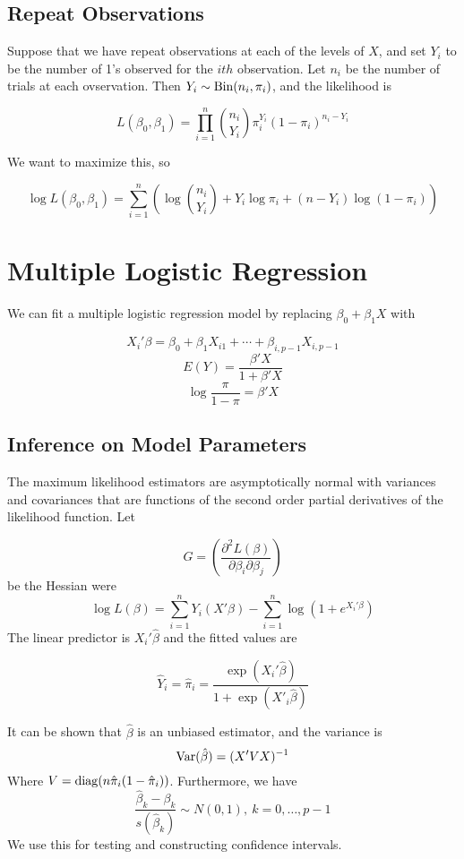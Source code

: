 \subsection{Repeat Observations}

Suppose that we have repeat observations at each of the levels of $X$, and set $Y_i$ to be the number of 1's observed for the $ith$ observation. Let $n_i$ be the number of trials at each ovservation. Then $Y_i \sim \operatorname{Bin}(n_i, \pi_i)$, and the likelihood
is 

\[L(\beta_0, \beta_1) = \prod_{i=1}^n {n_i \choose Y_i} \pi_i^{Y_i}(1-\pi_i)^{n_i - Y_i}\]

We want to maximize this, so 

\[\log L(\beta_0, \beta_1) = \sum_{i=1}^n \left(\log {n_i \choose Y_i} + Y_i \log \pi_i + (n-Y_i)\log(1-\pi_i)\right)\]

\section{Multiple Logistic Regression}

We can fit a multiple logistic regression model by replacing $\beta_0 + \beta_1X$ with 

\[X_i' \beta = \beta_0 + \beta_{1}X_{i1} + \cdots + \beta_{i,p-1}X_{i,p-1} \]
\[E(Y) = \frac{\beta'X}{1 + \beta'X}\]
\[\log\frac{\pi}{1-\pi} = \beta'X\]

\subsection{Inference on Model Parameters}

The maximum likelihood estimators are asymptotically normal with variances and covariances that are functions of the second order partial derivatives of the likelihood function. Let 

\[G = \left(\frac{\partial^2 L(\beta)}{\partial\beta_i \partial\beta_j}\right)\]
be the Hessian were 
\[\log L(\beta) = \sum_{i=1}^n Y_i (X'\beta) - \sum_{i=1}^n \log(1 + e^{X_i' \beta})\]
The linear predictor is $X_i'\hat{\beta}$ and the fitted values are 

\[\hat{Y}_i = \hat{\pi}_i = \frac{\exp(X_i'\hat{\beta})}{1 + \exp(X'_i\hat{\beta})}\]

It can be shown that $\hat{\beta}$ is an unbiased estimator, and the variance is 
\[\operatorname{Var}(\hat{\beta}) = (X'VX)^{-1}\]
Where $V = \operatorname{diag}(n\hat{\pi}_i(1-\hat{\pi}_i))$. Furthermore, we have 
\[\frac{\hat{\beta}_k - \beta_k}{s(\hat{\beta}_k)} \sim N(0,1), \ k = 0, \ldots, p-1\]
\noindent
We use this for testing and constructing confidence intervals.

